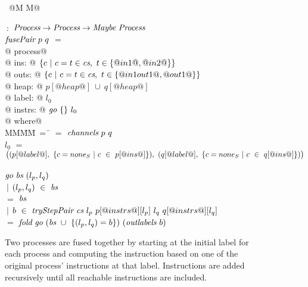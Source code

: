 
\begin{figure}

\begin{tabbing}
~@M M@   \TABDEF \kill

 \> $~:$ \> $\textit{Process} \to \textit{Process} \to  \textit{Maybe}~\textit{Process}$ \\
$\textit{fusePair}~p~q$ \> $=$ \\
@    process@ \\
@        ins: @ $\{ c~|~c=t \in \textit{cs},~t \in \{ @in1@,@in2@ \} \} $ \\
@       outs: @ $\{ c~|~c=t \in \textit{cs},~t \in \{ @in1out1@,@out1@ \} \} $ \\
@       heap: @ $p[@heap@]~\cup~q[@heap@]$ \\
@      label: @ $l_0$ \\
@     instrs: @ $\textit{go}~\{  \}~l_0$ \\
@ where@ \\
MM\=MM\=~=~\=\kill
 \> \cs \> $=$ \> $\textit{channels}~p~q$ \\
 \> $l_0$   \> $=$ \> $
      \big( 
      (p[@label@],~\{ c=none_S~|~c~\in~p[@ins@] \}),~
      (q[@label@],~\{ c=none_S~|~c~\in~q[@ins@] \})
      \big)$ \\
 \\
 \> $\textit{go}~\textit{bs}~(l_p,l_q)$ \\
 \> \> $~|$ \> $(l_p,l_q)~\in~\textit{bs}$ \\
 \> \> $=$  \> $\textit{bs}$ \\
 \> \> $~|$ \>
        $b~\in~\textit{tryStepPair}~\textit{cs}~l_p~p[@instrs@][l_p]~l_q~q[@instrs@][l_q]$ \\ 
 \> \> $=$ \> $\textit{fold}~\textit{go}~(\textit{bs}~\cup~\{ (l_p,l_q)=b \})~(\textit{outlabels}~b)$ \\
\end{tabbing}

\caption{Two processes are fused together by starting at the initial label for each process and computing the instruction based on one of the original process' instructions at that label.
Instructions are added recursively until all reachable instructions are included.
}
\label{fig:Fusion:Def:Top}
\end{figure}




